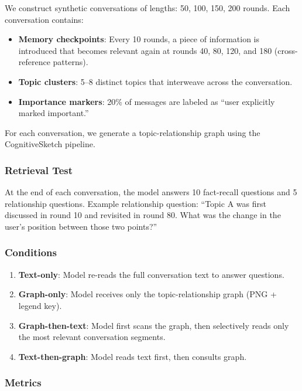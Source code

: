 \documentclass[11pt,a4paper]{article}
\begin{document}
We construct synthetic conversations of lengths: 50, 100, 150, 200 rounds. Each conversation contains:
\begin{itemize}[nosep]
\item \textbf{Memory checkpoints}: Every 10 rounds, a piece of information is introduced that becomes relevant again at rounds 40, 80, 120, and 180 (cross-reference patterns).
\item \textbf{Topic clusters}: 5--8 distinct topics that interweave across the conversation.
\item \textbf{Importance markers}: 20\% of messages are labeled as ``user explicitly marked important.''
\end{itemize}

For each conversation, we generate a topic-relationship graph using the CognitiveSketch pipeline.

\subsubsection{Retrieval Test}

At the end of each conversation, the model answers 10 fact-recall questions and 5 relationship questions. Example relationship question: ``Topic A was first discussed in round 10 and revisited in round 80. What was the change in the user's position between those two points?''

\subsubsection{Conditions}

\begin{enumerate}[nosep]
\item \textbf{Text-only}: Model re-reads the full conversation text to answer questions.
\item \textbf{Graph-only}: Model receives only the topic-relationship graph (PNG + legend key).
\item \textbf{Graph-then-text}: Model first scans the graph, then selectively reads only the most relevant conversation segments.
\item \textbf{Text-then-graph}: Model reads text first, then consults graph.
\end{enumerate}

\subsubsection{Metrics}
\end{document}
